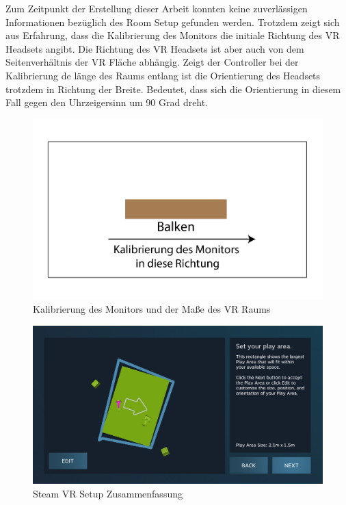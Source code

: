 Zum Zeitpunkt der Erstellung dieser Arbeit konnten keine zuverlässigen Informationen bezüglich des Room Setup gefunden werden.
Trotzdem zeigt sich aus Erfahrung, dass die Kalibrierung des Monitors die initiale Richtung des VR Headsets angibt.
Die Richtung des VR Headsets ist aber auch von dem Seitenverhältnis der VR Fläche abhängig.
Zeigt der Controller bei der Kalibrierung de länge des Raums entlang ist die Orientierung des Headsets trotzdem in Richtung der Breite.
Bedeutet, dass sich die Orientierung in diesem Fall gegen den Uhrzeigersinn um 90 Grad dreht.

\begin{figure}
    \centering
    \includegraphics[scale=0.2]{pics/monitor_calibration}
    \caption{Kalibrierung des Monitors und der Maße des VR Raums}
    \label{fig:steam-vr-calibration}
\end{figure}

\begin{figure}
    \centering
    \includegraphics[scale=0.4]{pics/steam-vr-summary}
    \caption{Steam VR Setup Zusammenfassung}
    \label{fig:steam-vr-summary}
\end{figure}



